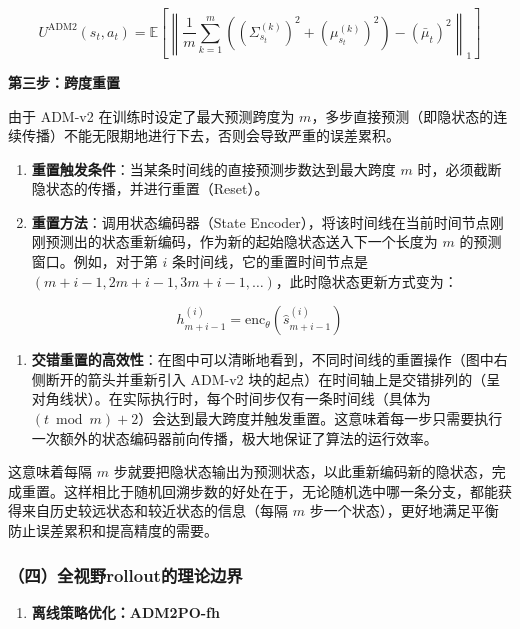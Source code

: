 \[
U^{\mathrm{ADM2}}(s_t,a_t)
=
\mathbb{E}
\left[
\left\|
\frac{1}{m}
\sum_{k=1}^{m}
\left(
(\Sigma_{s_t}^{(k)})^2
+
(\mu_{s_t}^{(k)})^2
\right)
-
(\bar{\mu}_t)^2
\right\|_1
\right]
\]

\textbf{第三步：跨度重置}

由于 ADM-v2 在训练时设定了最大预测跨度为 \(m\)，多步直接预测（即隐状态的连续传播）不能无限期地进行下去，否则会导致严重的误差累积。

\begin{enumerate}
\def\labelenumi{\arabic{enumi}.}
\item
  \textbf{重置触发条件}：当某条时间线的直接预测步数达到最大跨度 \(m\) 时，必须截断隐状态的传播，并进行重置（Reset）。
\item
  \textbf{重置方法}：调用状态编码器（State Encoder），将该时间线在当前时间节点刚刚预测出的状态重新编码，作为新的起始隐状态送入下一个长度为 \(m\) 的预测窗口。例如，对于第 \(i\) 条时间线，它的重置时间节点是 \((m+i-1,2m+i-1,3m+i-1,\ldots)\)，此时隐状态更新方式变为：
\end{enumerate}

\[
h_{m+i-1}^{(i)}=\mathrm{enc}_\theta(\hat{s}_{m+i-1}^{(i)})
\]

\begin{enumerate}
\def\labelenumi{\arabic{enumi}.}
\setcounter{enumi}{2}
\tightlist
\item
  \textbf{交错重置的高效性}：在图中可以清晰地看到，不同时间线的重置操作（图中右侧断开的箭头并重新引入 ADM-v2 块的起点）在时间轴上是交错排列的（呈对角线状）。在实际执行时，每个时间步仅有一条时间线（具体为 \((t\bmod m)+2\)）会达到最大跨度并触发重置。这意味着每一步只需要执行一次额外的状态编码器前向传播，极大地保证了算法的运行效率。
\end{enumerate}

这意味着每隔 \(m\) 步就要把隐状态输出为预测状态，以此重新编码新的隐状态，完成重置。这样相比于随机回溯步数的好处在于，无论随机选中哪一条分支，都能获得来自历史较远状态和较近状态的信息（每隔 \(m\) 步一个状态），更好地满足平衡防止误差累积和提高精度的需要。

\hypertarget{ux56dbux5168ux89c6ux91cerolloutux7684ux7406ux8bbaux8fb9ux754c}{%
\subsubsection{（四）全视野rollout的理论边界}\label{ux56dbux5168ux89c6ux91cerolloutux7684ux7406ux8bbaux8fb9ux754c}}

\begin{enumerate}
\def\labelenumi{\arabic{enumi}.}
\tightlist
\item
  \textbf{离线策略优化：ADM2PO-fh}
\end{enumerate}

